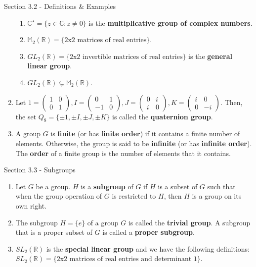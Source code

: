 \documentclass[12pt]{article}
\theoremstyle{definition}
\theoremstyle{named}
\begin{document}
\begin{section}{Section 3.2 - Definitions \& Examples}
\begin{enumerate}
\begin{enumerate}
            \item $\mathbb{C}^\star = \{z \in \mathbb{C}: z \neq 0\}$ is the \textbf{multiplicative group of complex numbers}. 
            \item $\mathbb{M}_2(\mathbb{R}) = \{\textrm{2x2 matrices of real entries}\}$. 
            \item $GL_2(\mathbb{R}) = \{\textrm{2x2 invertible matrices of real entries}\}$ is the \textbf{general linear group}.
            \item $GL_2(\mathbb{R}) \subsetneq \mathbb{M}_2(\mathbb{R})$. 
        \end{enumerate}
        \item Let $1 = \begin{pmatrix}
            1 & 0 \\
            0 & 1
        \end{pmatrix}, I = \begin{pmatrix}
            0 & 1 \\
            -1 & 0
        \end{pmatrix}, J = \begin{pmatrix}
            0 & i \\
            i & 0
        \end{pmatrix}, K = \begin{pmatrix}
            i & 0 \\
            0 & -i
        \end{pmatrix}.$ Then, the set $Q_8 = \{\pm 1, \pm I, \pm J, \pm K\}$ is called the \textbf{quaternion group}. 
        \item A group $G$ is \textbf{finite} (or has \textbf{finite order}) if it contains a finite number of elements. Otherwise, the group is said to be \textbf{infinite} (or has \textbf{infinite order}). The \textbf{order} of a finite group is the number of elements that it contains. 
    \end{enumerate}
\end{section}

\begin{section}{Section 3.3 - Subgroups}
    \begin{enumerate}
        \item Let $G$ be a group. $H$ is a \textbf{subgroup} of $G$ if $H$ is a subset of $G$ such that when the group operation of $G$ is restricted to $H$, then $H$ is a group on its own right. 
        \item The subgroup $H = \{e\}$ of a group $G$ is called the \textbf{trivial group}. A subgroup that is a proper subset of $G$ is called a \textbf{proper subgroup}. 
        \item $SL_2(\mathbb{R})$ is the \textbf{special linear group} and we have the following definitions: $SL_2(\mathbb{R}) = \{\textrm{2x2 matrices of real entries and determinant 1}\}$. 
    \end{enumerate}
\end{section}
\end{document}
